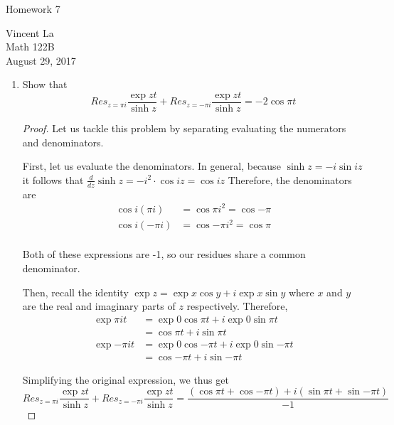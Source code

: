 \documentclass[11pt]{article}
\title{ }
\begin{document}
	\begin{center}	%
		\Large{Homework 7}	%
	\end{center}
	\begin{center}
		Vincent La \\
		Math 122B \\
		August 29, 2017
	\end{center}
	
\begin{enumerate}
	\item Show that
	\[Res_{z=\pi i} \frac{\exp{zt}}{\sinh{z}} + Res_{z=-\pi i} \frac{\exp{zt}}{\sinh{z}} = -2\cos{\pi t} \]
	
	\begin{proof}
		Let us tackle this problem by separating evaluating the numerators and denominators.
		
		\bigskip
		
		First, let us evaluate the denominators. In general, because
		$\sinh{z} = -i\sin{iz}$
		it follows that 
		$\frac{d}{dz} \sinh{z} = -i^2 \cdot \cos{iz} = \cos{iz}$
		Therefore, the denominators are
			\[\begin{aligned}
			\cos{i(\pi i)} &= \cos{\pi i^2} = \cos{-\pi}\\
			\cos{i(-\pi i)} &= \cos{-\pi i^2} = \cos{\pi}\\			
			\end{aligned}\]
			
		Both of these expressions are -1, so our residues share a common denominator.
		
		\bigskip
		
		Then, recall the identity
		$\exp{z} = \exp{x}\cos{y} + i \exp{x}\sin{y}$
		where $x$ and $y$ are the real and imaginary parts of $z$ respectively. Therefore,
		\[\begin{aligned}
		\exp{\pi it}
			&= \exp{0}\cos{\pi t} + i\exp{0} \sin{\pi t} \\
			&= \cos{\pi t} + i\sin{\pi t} \\
		\exp{-\pi it}
			&= \exp{0}\cos{-\pi t} + i\exp{0} \sin{-\pi t} \\		
			&= \cos{-\pi t} + i\sin{-\pi t}
		\end{aligned}\]
		
		\bigskip
		
		Simplifying the original expression, we thus get
		\[ Res_{z=\pi i} \frac{\exp{zt}}{\sinh{z}} + Res_{z=-\pi i} \frac{\exp{zt}}{\sinh{z}}
		=  \frac{ (\cos{\pi t} + \cos{-\pi t}) + i( \sin{\pi t} + \sin{-\pi t} )}{
				   -1} \]
				

\end{proof}
\end{enumerate}
\end{document}
